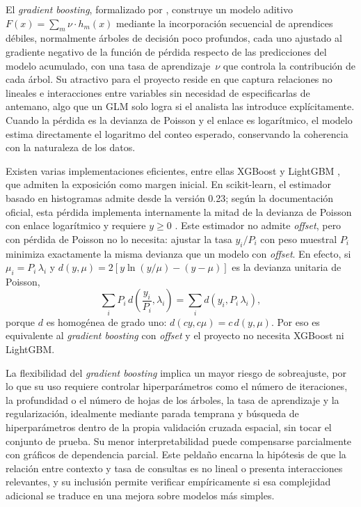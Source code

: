 El \textit{gradient boosting}, formalizado por \textcite{friedman2001}, construye un modelo
aditivo $F(x) = \sum_m \nu \cdot h_m(x)$ mediante la incorporación secuencial de aprendices
débiles, normalmente árboles de decisión poco profundos, cada uno ajustado al gradiente
negativo de la función de pérdida respecto de las predicciones del modelo acumulado, con una
tasa de aprendizaje~$\nu$ que controla la contribución de cada árbol. Su atractivo para el
proyecto reside en que captura relaciones no lineales e interacciones entre variables sin
necesidad de especificarlas de antemano, algo que un GLM solo logra si el analista las
introduce explícitamente. Cuando la pérdida es la devianza de Poisson y el enlace es
logarítmico, el modelo estima directamente el logaritmo del conteo esperado, conservando la
coherencia con la naturaleza de los datos.

Existen varias implementaciones eficientes, entre ellas XGBoost \parencite{chen2016} y
LightGBM \parencite{ke2017}, que admiten la exposición como margen inicial. En
scikit-learn, el estimador basado en histogramas 
admite  desde la versión 0.23; según la documentación
oficial, esta pérdida implementa internamente la mitad de la devianza de Poisson con enlace
logarítmico y requiere $y \ge 0$ \parencite{sklearn-hgb}. Este estimador no admite
\textit{offset}, pero con pérdida de Poisson no lo necesita: ajustar la tasa $y_i / P_i$ con
peso muestral $P_i$ minimiza exactamente la misma devianza que un modelo con
\textit{offset}. En efecto, si $\mu_i = P_i\,\lambda_i$ y
$d(y,\mu) = 2\left[y \ln(y/\mu) - (y - \mu)\right]$ es la devianza unitaria de Poisson,
\[
  \sum_i P_i\, d\!\left(\frac{y_i}{P_i}, \lambda_i\right)
  = \sum_i d(y_i, P_i\,\lambda_i),
\]
porque $d$ es homogénea de grado uno: $d(cy, c\mu) = c\,d(y,\mu)$. Por eso
 es equivalente al \textit{gradient boosting} con
\textit{offset} y el proyecto no necesita XGBoost ni LightGBM.

La flexibilidad del \textit{gradient boosting} implica un mayor riesgo de sobreajuste, por
lo que su uso requiere controlar hiperparámetros como el número de iteraciones, la
profundidad o el número de hojas de los árboles, la tasa de aprendizaje y la
regularización, idealmente mediante parada temprana y búsqueda de hiperparámetros dentro de
la propia validación cruzada espacial, sin tocar el conjunto de prueba. Su menor
interpretabilidad puede compensarse parcialmente con gráficos de dependencia parcial. Este
peldaño encarna la hipótesis de que la relación entre contexto y tasa de consultas es no
lineal o presenta interacciones relevantes, y su inclusión permite verificar empíricamente
si esa complejidad adicional se traduce en una mejora sobre modelos más simples.

